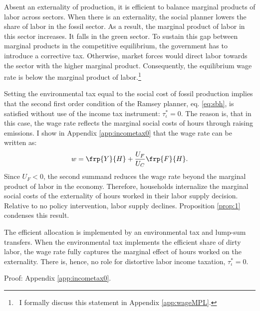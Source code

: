 Absent an externality of production, it is efficient to balance marginal products of labor across sectors.
When there is an externality, the social planner lowers the share of labor in the fossil sector. As a result, the marginal product of labor in this sector increases. It falls in the green sector. To sustain this gap between marginal products in the competitive equilibrium, the government has to introduce a corrective tax. Otherwise, market forces would direct labor towards the sector with the higher marginal product. Consequently, the equilibrium wage rate is below the marginal product of labor.\footnote{\ I formally discuss this statement in Appendix \ref{app:wageMPL}.} 

Setting the environmental tax equal to the social cost of fossil production implies that the second first order condition of the Ramsey planner, eq. \eqref{eq:sbh}, is satisfied without use of the income tax instrument: $\tau_{\iota}^*=0$. 
The reason is, that in this case, the wage rate reflects the marginal social costs of hours through raising emissions. I show in Appendix \ref{app:incometax0} that the wage rate can be written as:
\begin{align*}
w = \frp{Y}{H}+\frac{U_F}{U_C}\frp{F}{H}.
\end{align*}
Since $U_F<0$, the second summand reduces the wage rate beyond the marginal product of labor in the economy.
Therefore, households internalize the marginal social costs of the externality of hours worked in their labor supply decision. Relative to no policy intervention, labor supply declines. Proposition \ref{prop:1} condenses this result.

\begin{prop}\label{prop:1}
	The efficient allocation is implemented by an environmental tax and lump-sum transfers.  When the environmental tax implements the efficient share of dirty labor, the wage rate fully captures the marginal effect of hours worked on the externality. There is, hence, no role for distortive labor income taxation, $\tau_{\iota}^*=0$.
\end{prop}
Proof: Appendix \ref{app:incometax0}. 



